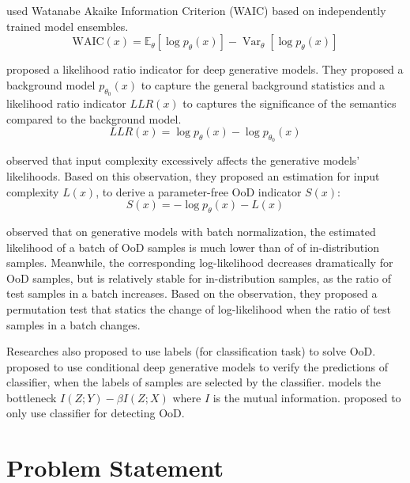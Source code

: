 \documentclass[letterpaper]{article} %
\begin{document}
\cite{choi2018waic} used Watanabe Akaike Information Criterion (WAIC) based on independently trained model ensembles.
\begin{equation}
	\text{WAIC}(x) = \mathbb{E}_{\theta} [\log p_\theta(x)] - \operatorname{Var}_{\theta} [\log p_\theta(x)]
\end{equation}

\cite{ren2019likelihood} proposed a likelihood ratio indicator for deep generative models. They proposed a background model $p_{\theta_0}(x)$ to capture the general background statistics and a likelihood ratio indicator $LLR(x)$ to captures the significance of the semantics compared to the background model. 
\begin{equation}
LLR(x) = \log p_\theta(x) - \log p_{\theta_0}(x)
\end{equation}

\cite{nalisnick2018deep} observed that input complexity excessively affects the generative models' likelihoods. Based on this observation, they proposed an estimation for input complexity $L(x)$, to derive a parameter-free OoD indicator $S(x)$:
\begin{equation}
	S(x) = -\log p_\theta(x) - L(x)
\end{equation}

\cite{song2019unsupervised} observed that on generative models with batch normalization, the estimated likelihood of a batch of OoD samples is much lower than of of in-distribution samples. Meanwhile, the corresponding log-likelihood decreases dramatically for OoD samples, but is relatively stable for in-distribution samples, as the ratio of test samples in a batch increases. Based on the observation, they proposed a permutation test that statics the change of log-likelihood when the ratio of test samples in a batch changes. 

Researches also proposed to use labels (for classification task) to solve OoD. 
\cite{che2019deep} proposed to use conditional deep generative models to verify the predictions of classifier, when the labels of samples are selected by the classifier. \cite{alemi2018uncertainty} models the bottleneck $I(Z;Y)-\beta I(Z;X)$ where $I$ is the mutual information. 
\cite{hendrycks2016baseline,hendrycks2018deep,hsu2020generalized,lee2018simple} proposed to only use classifier for detecting OoD. 

\section{Problem Statement}\label{sec2}
\end{document}
